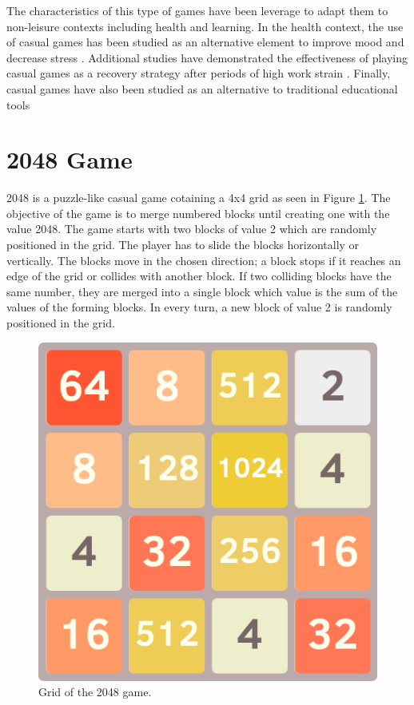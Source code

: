 The characteristics of this type of games have been leverage to adapt them to non-leisure contexts including health and learning. In the health context, the use of casual games has been studied as an alternative element to improve mood and decrease stress \citep{russoniello2009effectiveness}. Additional studies have demonstrated the effectiveness of playing casual games as a recovery strategy after periods of high work strain \citep{reinecke2009games}. Finally, casual games have also been studied as an alternative to traditional educational tools \citep{peirce2010personalised}

\section{2048 Game}
2048 is a puzzle-like casual game cotaining a 4x4 grid as seen in Figure \ref{fig:2048-grid}. The objective of the game is to merge numbered blocks until creating one with the value 2048. The game starts with two blocks of value 2 which are randomly positioned in the grid. The player has to slide the blocks horizontally or vertically. The blocks move in the chosen direction; a block stops if it reaches an edge of the grid or collides with another block. If two colliding blocks have the same number, they are merged into a single block which value is the sum of the values of the forming blocks. In every turn, a new block of value 2 is randomly positioned in the grid.

\begin{figure}[htb]
    \vskip 5mm
        \begin{center}
            \includegraphics[scale=0.5]{./Figures/game_grid.png}
            \caption{Grid of the 2048 game.}
            \label{fig:2048-grid}
        \end{center}
    \vskip -5mm
\end{figure}

